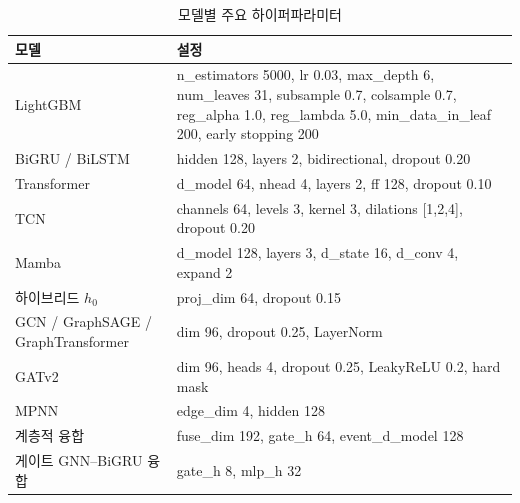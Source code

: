 \begin{table}[htbp]
  \centering
  \caption{모델별 주요 하이퍼파라미터}
  \label{tab:app-hparams}
  \small
  \begin{tabularx}{\linewidth}{@{}lX@{}}
    \toprule
    모델 & 설정 \\
    \midrule
    LightGBM & n\_estimators 5000, lr 0.03, max\_depth 6, num\_leaves 31, subsample 0.7, colsample 0.7, reg\_alpha 1.0, reg\_lambda 5.0, min\_data\_in\_leaf 200, early stopping 200 \\
    BiGRU / BiLSTM & hidden 128, layers 2, bidirectional, dropout 0.20 \\
    Transformer & d\_model 64, nhead 4, layers 2, ff 128, dropout 0.10 \\
    TCN & channels 64, levels 3, kernel 3, dilations [1,2,4], dropout 0.20 \\
    Mamba & d\_model 128, layers 3, d\_state 16, d\_conv 4, expand 2 \\
    하이브리드 $h_0$ & proj\_dim 64, dropout 0.15 \\
    GCN / GraphSAGE / GraphTransformer & dim 96, dropout 0.25, LayerNorm \\
    GATv2 & dim 96, heads 4, dropout 0.25, LeakyReLU 0.2, hard mask \\
    MPNN & edge\_dim 4, hidden 128 \\
    계층적 융합 & fuse\_dim 192, gate\_h 64, event\_d\_model 128 \\
    게이트 GNN--BiGRU 융합 & gate\_h 8, mlp\_h 32 \\
    \bottomrule
  \end{tabularx}
\end{table}
